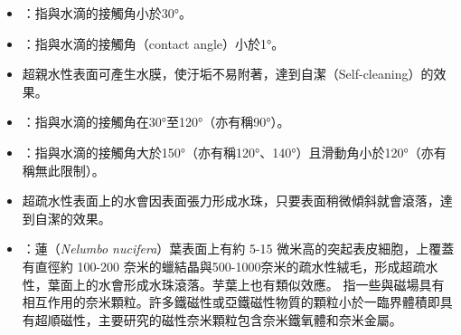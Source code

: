 \documentclass[a4paper,12pt]{report}
\begin{document}
\begin{itemize}
\begin{itemize}
夜行性飛蛾的複眼表面有奈米柱狀結構，呈現漸變折射率（graded index），導致大部分的光都被吸收，只有極少被反射，而呈黑色，即使在月光下覓食或活動也不易被天敵發現。奈米柱狀結構的蛾眼效應可用於抗反射膜鏡片、光電元件等。
\bit
\item {}：指與水滴的接觸角小於30°。
\item {}：指與水滴的接觸角（contact angle）小於1°。
\item 超親水性表面可產生水膜，使汙垢不易附著，達到自潔（Self-cleaning）的效果。
\eit
{}
\bit
\item {}：指與水滴的接觸角在30°至120°（亦有稱90°）。
\item {}：指與水滴的接觸角大於150°（亦有稱120°、140°）且滑動角小於120°（亦有稱無此限制）。
\item 超疏水性表面上的水會因表面張力形成水珠，只要表面稍微傾斜就會滾落，達到自潔的效果。
\item {}：蓮（\textit{Nelumbo nucifera}）葉表面上有約 5-15 微米高的突起表皮細胞，上覆蓋有直徑約 100-200 奈米的蠟結晶與500-1000奈米的疏水性絨毛，形成超疏水性，葉面上的水會形成水珠滾落。芋葉上也有類似效應。
\eit
{}
指一些與磁場具有相互作用的奈米顆粒。許多鐵磁性或亞鐵磁性物質的顆粒小於一臨界體積即具有超順磁性，主要研究的磁性奈米顆粒包含奈米鐵氧體和奈米金屬。

\end{itemize}
\end{itemize}
\end{document}
